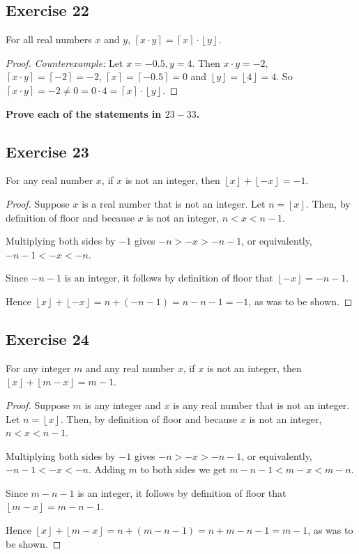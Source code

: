 \documentclass[14pt]{extarticle}
\newcommand{\cy}{\color{cyan}}
\newcommand{\floor}[1]{{\left\lfloor#1\right\rfloor}}
\newcommand{\ceil}[1]{{\left\lceil#1\right\rceil}}
\begin{document}
\subsection{Exercise 22}
For all real numbers $x$ and $y$, $\ceil{x \cdot y} = \ceil{x} \cdot \floor{y}$.

\begin{proof}
{\it Counterexample:} Let $x = -0.5, y = 4$. Then $x\cdot y = -2$, $\ceil{x\cdot y} = \ceil{-2} = -2$, $\ceil{x} = \ceil{-0.5} = 0$ and $\floor{y} = \floor{4} = 4$. So $\ceil{x\cdot y} = -2 \neq 0 = 0 \cdot 4 = \ceil{x} \cdot \floor{y}$.
\end{proof}

{\bf \cy Prove each of the statements in $23-33$.}

\subsection{Exercise 23}
For any real number $x$, if $x$ is not an integer, then $\floor{x} + \floor{-x} = -1$.

\begin{proof}
Suppose $x$ is a real number that is not an integer. Let $n = \floor{x}$. Then, by definition of floor and because $x$ is not an integer, $n < x < n - 1$. 

Multiplying both sides by $-1$ gives $-n > -x > -n - 1$, or equivalently, $-n - 1 < -x < -n$. 

Since $-n - 1$ is an integer, it follows by definition of floor that $\floor{-x} = -n - 1$. 

Hence $\floor{x} + \floor{-x} = n + (-n - 1) = n - n - 1 = -1$, as was to be shown.
\end{proof}

\subsection{Exercise 24}
For any integer $m$ and any real number $x$, if $x$ is not an integer, then $\floor{x} + \floor{m-x} = m-1$.

\begin{proof}
Suppose $m$ is any integer and $x$ is any real number that is not an integer. Let $n = \floor{x}$. Then, by definition of floor and because $x$ is not an integer, $n < x < n - 1$. 

Multiplying both sides by $-1$ gives $-n > -x > -n - 1$, or equivalently, $-n - 1 < -x < -n$. Adding $m$ to both sides we get $m - n - 1 < m - x < m - n$.

Since $m - n - 1$ is an integer, it follows by definition of floor that $\floor{m - x} = m - n - 1$. 

Hence $\floor{x} + \floor{m - x} = n + (m - n - 1) = n + m - n - 1 = m - 1$, as was to be shown.
\end{proof}
\end{document}
